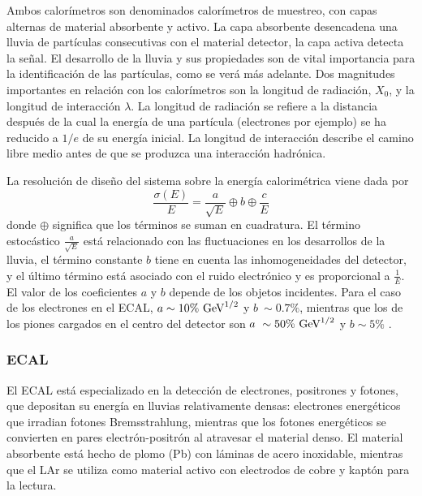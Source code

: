Ambos calorímetros son denominados calorímetros de muestreo, con capas alternas de material absorbente y activo. La capa absorbente desencadena una lluvia de part\'iculas consecutivas con el material detector, la capa activa detecta la señal.
El desarrollo de la lluvia y sus propiedades son de vital importancia para la identificación de las partículas, como se verá más adelante.
Dos magnitudes importantes en relación con los calorímetros son la longitud de radiación, $X_0$, y la longitud de interacción $\lambda$. La longitud de radiación se refiere a la distancia después de la cual la energía de una partícula (electrones por ejemplo) se ha reducido a \(1/e\) de su energía inicial. La longitud de interacción describe el camino libre medio antes de que se produzca una interacción hadrónica.

La resolución de diseño del sistema sobre la energía calorimétrica viene dada por
\begin{equation}
    \frac{\sigma(E)}{E} = 
    \frac{a}{\sqrt{E}} \oplus b \oplus \frac{c}{E}
\end{equation}
donde \(\oplus\) significa que los términos se suman en cuadratura. El término estocástico \(\frac{a}{\sqrt{E}}\) está relacionado con las fluctuaciones en los desarrollos de la lluvia, el término constante \(b\) tiene en cuenta las inhomogeneidades del detector, y el último término está asociado con el ruido electrónico y es proporcional a \(\frac{1}{E}\). El valor de los coeficientes \(a\) y \(b\) depende de los objetos incidentes. Para el caso de los electrones en el \ac{ECAL}, \(a\sim 10\%~\text{GeV}^{1/2}\) y \(b~\sim 0.7\%\), mientras que los de los piones cargados en el centro del detector son \(a~\sim50\%~\text{GeV}^{1/2}\) y \(b\sim5\%\) \cite{ATLAS-Calorimeters-PerformanceRun2}.



\subsubsection{\acf{ECAL}}
\label{subsubsec:atlas:atlas:cals:ecal}

El \ac{ECAL} está especializado en la detección de electrones, positrones y fotones, que depositan su energía en lluvias relativamente densas: electrones energéticos que irradian fotones Bremsstrahlung, mientras que los fotones energéticos se convierten en pares electrón-positrón al atravesar el material denso.
El material absorbente está hecho de plomo (Pb) con láminas de acero inoxidable, mientras que el \ac{LAr} se utiliza como material activo con electrodos de cobre y kapt\'on para la lectura.


